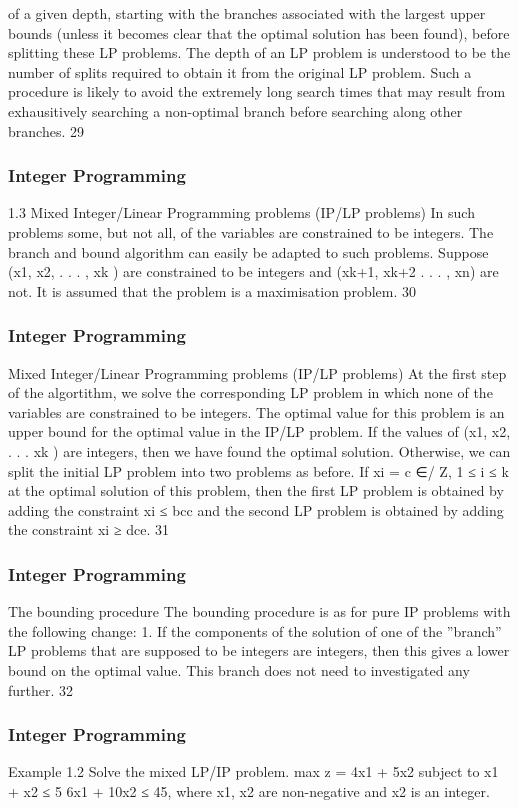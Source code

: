 \begin{frame}
of a given depth, starting with the branches associated with the
largest upper bounds (unless it becomes clear that the optimal
solution has been found), before splitting these LP problems.
The depth of an LP problem is understood to be the number of
splits required to obtain it from the original LP problem. Such a
procedure is likely to avoid the extremely long search times that
may result from exhausitively searching a non-optimal branch
before searching along other branches.
29 \end{frame}  \begin{frame} \frametitle{Integer Programming}     
1.3 Mixed Integer/Linear Programming problems (IP/LP
problems)
In such problems some, but not all, of the variables are constrained
to be integers. The branch and bound algorithm can easily be
adapted to such problems.
Suppose (x1, x2, . . . , xk ) are constrained to be integers and
(xk+1, xk+2 . . . , xn) are not. It is assumed that the problem is a
maximisation problem.
30 \end{frame}  \begin{frame} \frametitle{Integer Programming}     
Mixed Integer/Linear Programming problems (IP/LP
problems)
At the first step of the algortithm, we solve the corresponding LP
problem in which none of the variables are constrained to be
integers.
The optimal value for this problem is an upper bound for the
optimal value in the IP/LP problem. If the values of (x1, x2, . . . xk )
are integers, then we have found the optimal solution.
Otherwise, we can split the initial LP problem into two problems as
before. If xi = c ∈/ Z, 1 ≤ i ≤ k at the optimal solution of this
problem, then the first LP problem is obtained by adding the
constraint xi ≤ bcc and the second LP problem is obtained by
adding the constraint xi ≥ dce.
31 \end{frame}  \begin{frame} \frametitle{Integer Programming}     
The bounding procedure
The bounding procedure is as for pure IP problems with the
following change:
1. If the components of the solution of one of the
”branch” LP problems that are supposed to be
integers are integers, then this gives a lower bound
on the optimal value. This branch does not need to
investigated any further.
32 \end{frame}  \begin{frame} \frametitle{Integer Programming}     
Example 1.2
Solve the mixed LP/IP problem.
max z = 4x1 + 5x2
subject to
x1 + x2 ≤ 5
6x1 + 10x2 ≤ 45,
where x1, x2 are non-negative and x2 is an integer.

\end{frame}
